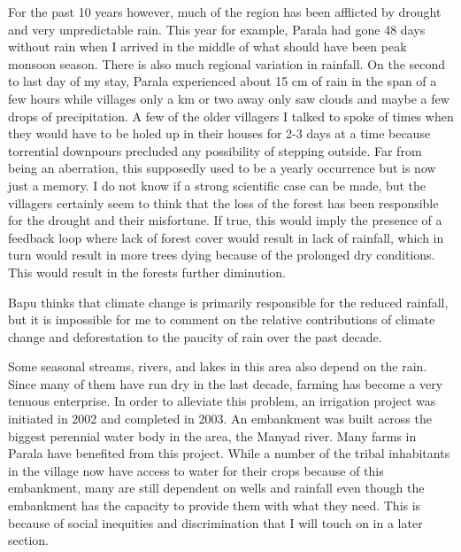 \documentclass{report}
\begin{document}
For the past 10 years however, much of the region has been afflicted by drought and very unpredictable rain. This year for example, Parala had gone 48 days without rain when I arrived in the middle of what should have been peak monsoon season. There is also much regional variation in rainfall. On the second to last day of my stay, Parala experienced about 15 cm of rain in the span of a few hours while villages only a km or two away only saw clouds and maybe a few drops of precipitation. A few of the older villagers I talked to spoke of times when they would have to be holed up in their houses for 2-3 days at a time because torrential downpours precluded any possibility of stepping outside. Far from being an aberration, this supposedly used to be a yearly occurrence but is now just a memory. I do not know if a strong scientific case can be made, but the villagers certainly seem to think that the loss of the forest has been responsible for the drought and their misfortune. If true, this would imply the presence of a feedback loop where lack of forest cover would result in lack of rainfall, which in turn would result in more trees dying because of the prolonged dry conditions. This would result in the forests further diminution.

Bapu thinks that climate change is primarily responsible for the reduced rainfall, but it is impossible for me to comment on the relative contributions of climate change and deforestation to the paucity of rain over the past decade.

Some seasonal streams, rivers, and lakes in this area also depend on the rain. Since many of them have run dry in the last decade, farming has become a very tenuous enterprise. In order to alleviate this problem, an irrigation project was initiated in 2002 and completed in 2003. An embankment was built across the biggest perennial water body in the area, the Manyad river. Many farms in Parala have benefited from this project. While a number of the tribal inhabitants in the village now have access to water for their crops because of this embankment, many are still dependent on wells and rainfall even though the embankment has the capacity to provide them with what they need. This is because of social inequities and discrimination that I will touch on in a later section.

\newpage


\end{document}
